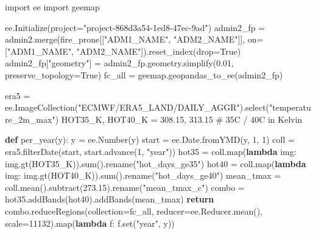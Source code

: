 \documentclass[
  letterpaper,
  DIV=11,
  numbers=noendperiod]{scrartcl}
\newenvironment{Shaded}{\begin{snugshade}}{\end{snugshade}}
\newcommand{\BuiltInTok}[1]{\textcolor[rgb]{0.00,0.23,0.31}{#1}}
\newcommand{\CommentTok}[1]{\textcolor[rgb]{0.37,0.37,0.37}{#1}}
\newcommand{\ControlFlowTok}[1]{\textcolor[rgb]{0.00,0.23,0.31}{\textbf{#1}}}
\newcommand{\DecValTok}[1]{\textcolor[rgb]{0.68,0.00,0.00}{#1}}
\newcommand{\FloatTok}[1]{\textcolor[rgb]{0.68,0.00,0.00}{#1}}
\newcommand{\ImportTok}[1]{\textcolor[rgb]{0.00,0.46,0.62}{#1}}
\newcommand{\KeywordTok}[1]{\textcolor[rgb]{0.00,0.23,0.31}{\textbf{#1}}}
\newcommand{\NormalTok}[1]{\textcolor[rgb]{0.00,0.23,0.31}{#1}}
\newcommand{\OperatorTok}[1]{\textcolor[rgb]{0.37,0.37,0.37}{#1}}
\newcommand{\StringTok}[1]{\textcolor[rgb]{0.13,0.47,0.30}{#1}}
\newcommand{\VariableTok}[1]{\textcolor[rgb]{0.07,0.07,0.07}{#1}}
\begin{document}
\begin{Shaded}
\begin{Highlighting}[]
\ImportTok{import}\NormalTok{ ee}
\ImportTok{import}\NormalTok{ geemap}

\NormalTok{ee.Initialize(project}\OperatorTok{=}\StringTok{"project{-}868d3a54{-}1ed8{-}47ec{-}9ad"}\NormalTok{)}
\NormalTok{admin2\_fp }\OperatorTok{=}\NormalTok{ admin2.merge(fire\_prone[[}\StringTok{"ADM1\_NAME"}\NormalTok{, }\StringTok{"ADM2\_NAME"}\NormalTok{]], on}\OperatorTok{=}\NormalTok{[}\StringTok{"ADM1\_NAME"}\NormalTok{, }\StringTok{"ADM2\_NAME"}\NormalTok{]).reset\_index(drop}\OperatorTok{=}\VariableTok{True}\NormalTok{)}
\NormalTok{admin2\_fp[}\StringTok{"geometry"}\NormalTok{] }\OperatorTok{=}\NormalTok{ admin2\_fp.geometry.simplify(}\FloatTok{0.01}\NormalTok{, preserve\_topology}\OperatorTok{=}\VariableTok{True}\NormalTok{)}
\NormalTok{fc\_all }\OperatorTok{=}\NormalTok{ geemap.geopandas\_to\_ee(admin2\_fp)}

\NormalTok{era5 }\OperatorTok{=}\NormalTok{ ee.ImageCollection(}\StringTok{"ECMWF/ERA5\_LAND/DAILY\_AGGR"}\NormalTok{).select(}\StringTok{"temperature\_2m\_max"}\NormalTok{)}
\NormalTok{HOT35\_K, HOT40\_K }\OperatorTok{=} \FloatTok{308.15}\NormalTok{, }\FloatTok{313.15}  \CommentTok{\# 35C / 40C in Kelvin}

\KeywordTok{def}\NormalTok{ per\_year(y):}
\NormalTok{    y }\OperatorTok{=}\NormalTok{ ee.Number(y)}
\NormalTok{    start }\OperatorTok{=}\NormalTok{ ee.Date.fromYMD(y, }\DecValTok{1}\NormalTok{, }\DecValTok{1}\NormalTok{)}
\NormalTok{    coll }\OperatorTok{=}\NormalTok{ era5.filterDate(start, start.advance(}\DecValTok{1}\NormalTok{, }\StringTok{"year"}\NormalTok{))}
\NormalTok{    hot35 }\OperatorTok{=}\NormalTok{ coll.}\BuiltInTok{map}\NormalTok{(}\KeywordTok{lambda}\NormalTok{ img: img.gt(HOT35\_K)).}\BuiltInTok{sum}\NormalTok{().rename(}\StringTok{"hot\_days\_ge35"}\NormalTok{)}
\NormalTok{    hot40 }\OperatorTok{=}\NormalTok{ coll.}\BuiltInTok{map}\NormalTok{(}\KeywordTok{lambda}\NormalTok{ img: img.gt(HOT40\_K)).}\BuiltInTok{sum}\NormalTok{().rename(}\StringTok{"hot\_days\_ge40"}\NormalTok{)}
\NormalTok{    mean\_tmax }\OperatorTok{=}\NormalTok{ coll.mean().subtract(}\FloatTok{273.15}\NormalTok{).rename(}\StringTok{"mean\_tmax\_c"}\NormalTok{)}
\NormalTok{    combo }\OperatorTok{=}\NormalTok{ hot35.addBands(hot40).addBands(mean\_tmax)}
    \ControlFlowTok{return}\NormalTok{ combo.reduceRegions(collection}\OperatorTok{=}\NormalTok{fc\_all, reducer}\OperatorTok{=}\NormalTok{ee.Reducer.mean(), scale}\OperatorTok{=}\DecValTok{11132}\NormalTok{).}\BuiltInTok{map}\NormalTok{(}\KeywordTok{lambda}\NormalTok{ f: f.}\BuiltInTok{set}\NormalTok{(}\StringTok{"year"}\NormalTok{, y))}


\end{Highlighting}
\end{Shaded}
\end{document}
